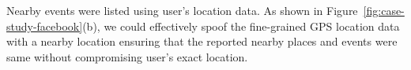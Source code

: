 Nearby events were listed using user's location
data. As shown in Figure~\ref{fig:case-study-facebook}(b), we could
effectively spoof the fine-grained GPS location data with a nearby location
ensuring that the reported nearby places and events were same without
compromising user's exact location. 

